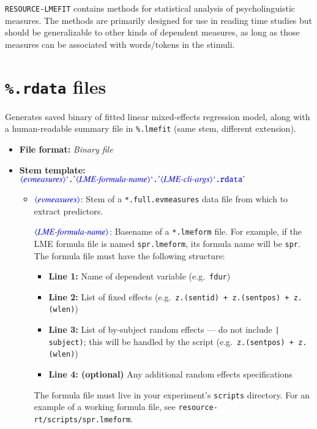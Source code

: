 \documentclass[12pt]{report}
\def\blue{\color{blue}}
\begin{document}
{\tt RESOURCE-LMEFIT} contains methods for statistical analysis of psycholinguistic measures. The methods are primarily designed for use in reading time studies but should be generalizable to other kinds of dependent measures, as long as those measures can be associated with words/tokens in the stimuli.


\section{{\blue\tt \%.rdata} files}

Generates saved binary of fitted linear mixed-effects regression model, along with a human-readable summary file in {\blue\tt \%.lmefit} (same stem, different extension).

\begin{itemize}
\item\textbf{File format:} \textit{Binary file}
\item\textbf{Stem template:}\\
$\dtype{evmeasures} \dcode{.} \dtype{LME-formula-name} \dcode{.} \dtype{LME-cli-args} \dcode{.rdata}$

\begin{itemize}
\item
$\dtype{evmeasures}$: Stem of a {\tt\blue *.full.evmeasures} data file from which to extract predictors.

$\dtype{LME-formula-name}$: Basename of a {\tt\blue *.lmeform} file.
For example, if the LME formula file is named {\tt\blue spr.lmeform}, its formula name will be {\tt\blue spr}.
The formula file must have the following structure:
\begin{itemize}
\item \textbf{Line 1:} Name of dependent variable (e.g.\ {\tt\blue fdur})
\item \textbf{Line 2:} List of fixed effects (e.g.\ {\tt\blue z.(sentid) + z.(sentpos) + z.(wlen)})
\item \textbf{Line 3:} List of by-subject random effects --- do not include {\tt\blue | subject)}; this will be handled by the script (e.g.\ {\tt\blue z.(sentpos) + z.(wlen)})
\item \textbf{Line 4: (optional)} Any additional random effects specifications
\end{itemize}
The formula file must live in your experiment's {\tt\blue scripts} directory.
For an example of a working formula file, see {\tt\blue resource-rt/scripts/spr.lmeform}.


\end{itemize}
\end{itemize}
\end{document}
